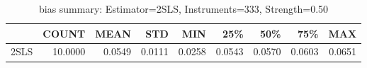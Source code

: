 \begin{table}[ht]
\centering
\caption{bias summary: Estimator=2SLS, Instruments=333, Strength=0.50}
\begin{tabular}{lrrrrrrrr}
\toprule
 & COUNT & MEAN & STD & MIN & 25\% & 50\% & 75\% & MAX \\
\midrule
2SLS & 10.0000 & 0.0549 & 0.0111 & 0.0258 & 0.0543 & 0.0570 & 0.0603 & 0.0651 \\
\bottomrule
\end{tabular}
\end{table}
